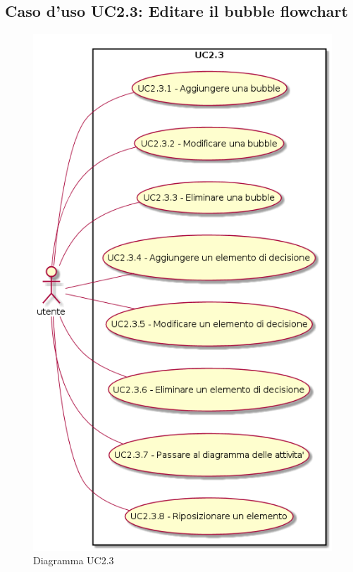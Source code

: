 \documentclass[../AnalisiDeiRequisiti.tex]{subfiles}
\begin{document}
					\subsection{Caso d'uso UC2.3: Editare il bubble flowchart}
					\begin{figure} [H]
						\centering
						\includegraphics[scale=0.45]{./Figures/UC2-3.png}
						\caption{Diagramma UC2.3}\label{}
					\end{figure}
\end{document}

